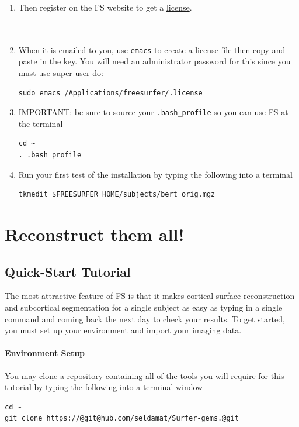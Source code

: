 \documentclass[paper=a4, fontsize=11pt]{scrartcl} %
\numberwithin{equation}{section} %
\numberwithin{figure}{section} %
\numberwithin{table}{section} %
\begin{document}
\begin{enumerate}
\item Then register on the FS website to get a \href{https://surfer.nmr.mgh.harvard.edu/registration.html}{license}.
\\~ \\~
\item When it is emailed to you, use \texttt{emacs} to create a license file then copy and paste in the key. You will need an administrator password for this since you must use super-user do:
\begin{lstlisting}[frame=single]
sudo emacs /Applications/freesurfer/.license
\end{lstlisting}  

\item IMPORTANT: be sure to source your \texttt{.bash\_profile} so you can use FS at the terminal
\begin{lstlisting}[frame=single]
cd ~
. .bash_profile
\end{lstlisting}
\item Run your first test of the installation by typing the following into a terminal
\begin{lstlisting}[frame=single]
tkmedit $FREESURFER_HOME/subjects/bert orig.mgz
\end{lstlisting}
\end{enumerate}

\section{Reconstruct them all!}
\subsection{Quick-Start Tutorial} The most attractive feature of  FS is that it makes cortical surface reconstruction and subcortical segmentation for a single subject as easy as typing in a single command and coming back the next day to check your results.  To get started, you must set up your environment and import your imaging data.
\paragraph{Environment Setup}You may clone a repository containing all of the tools you will require for this tutorial by typing the following into a terminal window

\begin{lstlisting}
cd ~
git clone https://@git@hub.com/seldamat/Surfer-gems.@git
\end{lstlisting}
\end{document}
